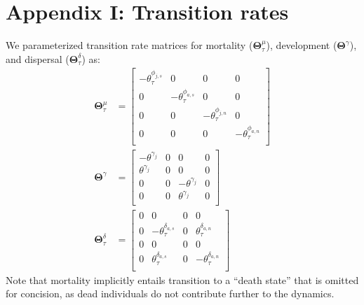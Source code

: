 
\section*{Appendix I: Transition rates} \label{sec:A1}


We parameterized transition rate matrices for mortality ($\boldsymbol\Theta^{\mu}_{\tau}$), 
development ($\boldsymbol\Theta^{\gamma}$), and dispersal ($\boldsymbol\Theta^{\delta}_{\tau}$) as:
\begin{equation} \label{eq:Theta}
\begin{aligned}
\boldsymbol\Theta^{\mu}_{\tau} & = 
\left[
\begin{array}{cc|cc}
    -\theta^{\phi_{j,s}}_{\tau} & 0 & 0 & 0 \\
    0 & -\theta^{\phi_{a,s}}_{\tau} & 0 & 0 \\
    \hline
    0 & 0 & -\theta^{\phi_{j,n}}_{\tau} & 0 \\
    0 & 0 & 0 & -\theta^{\phi_{a,n}}_{\tau} \\
    \end{array}
\right] \\
\boldsymbol\Theta^{\gamma} & = 
\left[
\begin{array}{cc|cc}
    -\theta^{\gamma_{j}} & 0 & 0 & 0 \\
    \theta^{\gamma_{j}}  & 0 & 0 & 0 \\
    \hline
    0 & 0 & -\theta^{\gamma_{j}} & 0 \\
    0 & 0 & \theta^{\gamma_{j}}  & 0 \\
    \end{array}
\right] \\
\boldsymbol\Theta^{\delta}_{\tau} & = 
\left[
\begin{array}{cc|cc}
    0 & 0 & 0 & 0 \\
    0 & -\theta^{\delta_{a,s}}_{\tau} & 0 & \theta^{\delta_{a,n}}_{\tau} \\
    \hline
    0 & 0 & 0 & 0 \\
    0 & \theta^{\delta_{a,s}}_{\tau} & 0 & -\theta^{\delta_{a,n}}_{\tau} \\
    \end{array}
\right]
\end{aligned}
\end{equation}
%
Note that mortality implicitly entails transition to a ``death state'' that is omitted 
for concision, as dead individuals do not contribute further to the dynamics.
